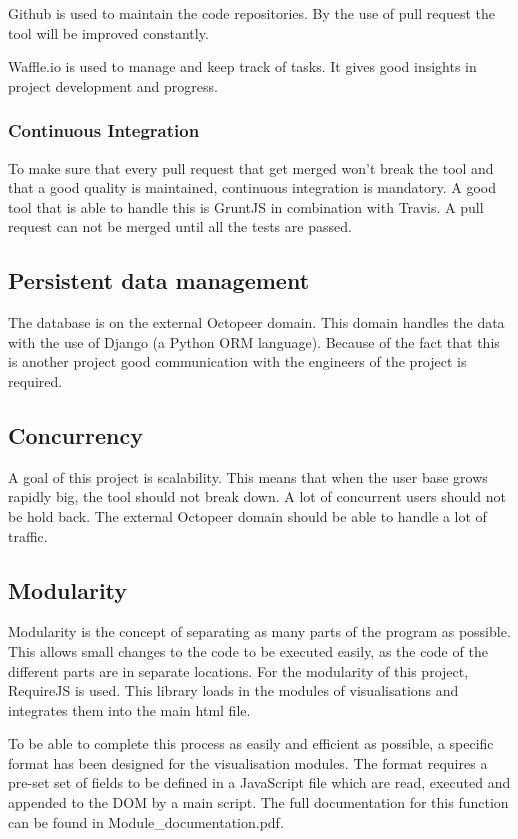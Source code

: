 \documentclass{article}
\begin{document}
Github is used to maintain the code repositories. By the use of pull request the tool will be improved constantly.

Waffle.io is used to manage and keep track of tasks. It gives good insights in project development and progress.

\subsubsection{Continuous Integration}

To make sure that every pull request that get merged won't break the tool and that a good quality is maintained, continuous integration is mandatory. A good tool that is able to handle this is GruntJS in combination with Travis. A pull request can not be merged until all the tests are passed.

\subsection{Persistent data management}

The database is on the external Octopeer domain. This domain handles the data with the use of Django (a Python ORM language). Because of the fact that this is another project good communication with the engineers of the project is required.

\subsection{Concurrency}

A goal of this project is scalability. This means that when the user base grows rapidly big, the tool should not break down. A lot of concurrent users should not be hold back. The external Octopeer domain should be able to handle a lot of traffic.

\subsection{Modularity}

Modularity is the concept of separating as many parts of the program as possible. This allows small changes to the code to be executed easily, as the code of the different parts are in separate locations. For the modularity of this project, RequireJS is used. This library loads in the modules of visualisations and integrates them into the main html file.

To be able to complete this process as easily and efficient as possible, a specific format has been designed for the visualisation modules. The format requires a pre-set set of fields to be defined in a JavaScript file which are read, executed and appended to the DOM by a main script. The full documentation for this function can be found in Module\_documentation.pdf.
\end{document}
